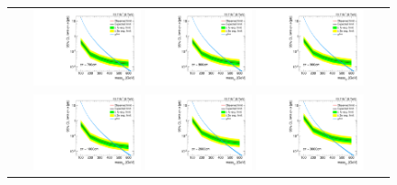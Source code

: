 \begin{figure}[!h]
  \centering 
  \begin{tabular}{c}
    \includegraphics[width=0.29\textwidth]{figures/analysis/Interpretation/ExclusionLimits/LimitPlot_ctau700cm.pdf} 
    \includegraphics[width=0.29\textwidth]{figures/analysis/Interpretation/ExclusionLimits/LimitPlot_ctau800cm.pdf} 
    \includegraphics[width=0.29\textwidth]{figures/analysis/Interpretation/ExclusionLimits/LimitPlot_ctau900cm.pdf} \\
    \includegraphics[width=0.29\textwidth]{figures/analysis/Interpretation/ExclusionLimits/LimitPlot_ctau1000cm.pdf} 
    \includegraphics[width=0.29\textwidth]{figures/analysis/Interpretation/ExclusionLimits/LimitPlot_ctau2000cm.pdf} 
    \includegraphics[width=0.29\textwidth]{figures/analysis/Interpretation/ExclusionLimits/LimitPlot_ctau3000cm.pdf} \\

\end{tabular}
\end{figure}

